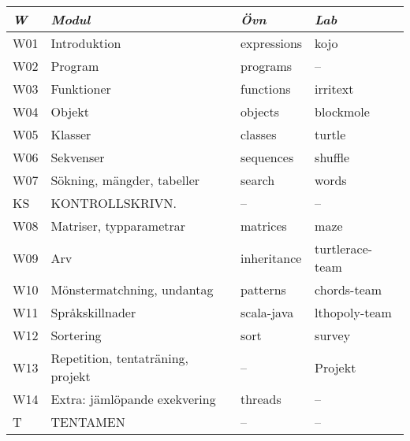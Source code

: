 \begin{tabular}{l|l|l|l}
\textit{W} & \textit{Modul} & \textit{Övn} & \textit{Lab} \\ \hline \hline
W01 & Introduktion & expressions & kojo \\
W02 & Program & programs & -- \\
W03 & Funktioner & functions & irritext \\
W04 & Objekt & objects & blockmole \\
W05 & Klasser & classes & turtle \\
W06 & Sekvenser & sequences & shuffle \\
W07 & Sökning, mängder, tabeller & search & words \\
KS & KONTROLLSKRIVN. & -- & -- \\
W08 & Matriser, typparametrar & matrices & maze \\
W09 & Arv & inheritance & turtlerace-team \\
W10 & Mönstermatchning, undantag & patterns & chords-team \\
W11 & Språkskillnader & scala-java & lthopoly-team \\
W12 & Sortering & sort & survey \\
W13 & Repetition, tentaträning, projekt & -- & Projekt \\
W14 & Extra: jämlöpande exekvering & threads & -- \\
T & TENTAMEN & -- & -- \\
\end{tabular}
